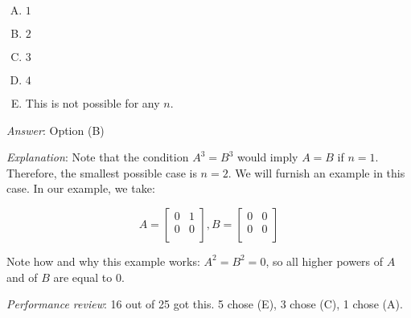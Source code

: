 \documentclass[10pt]{amsart}
\begin{document}
\begin{enumerate}
  \begin{enumerate}[(A)]
  \item $1$
  \item $2$
  \item $3$
  \item $4$
  \item This is not possible for any $n$.
  \end{enumerate}

  {\em Answer}: Option (B)

  {\em Explanation}: Note that the condition $A^3 = B^3$ would imply
  $A = B$ if $n = 1$. Therefore, the smallest possible case is $n =
  2$. We will furnish an example in this case. In our example, we take:

  $$A = \left[\begin{matrix} 0 & 1 \\ 0 & 0 \\\end{matrix} \right], B = \left[\begin{matrix} 0 & 0 \\ 0 & 0 \\\end{matrix}\right]$$

  Note how and why this example works: $A^2 = B^2 = 0$, so all higher
  powers of $A$ and of $B$ are equal to $0$.

  {\em Performance review}: 16 out of 25 got this. 5 chose (E), 3
  chose (C), 1 chose (A).
\end{enumerate}
\end{document}
